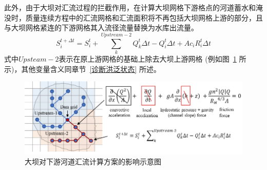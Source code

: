 此外，由于大坝对汇流过程的拦截作用，在计算大坝网格下游格点的河道蓄水和淹没时，质量连续方程中的汇流网格和汇流面积将不再包括大坝网格上游的部分，且与大坝网格紧连的下游网格其入流径流量替换为水库出流量。
\begin{equation}
S_{i}^{t+\Delta t}=S_{i}^{t}+\sum_{k}^{Upstream-2} Q_{k}^{t} \Delta t-Q_{i}^{t} \Delta t+A c_{i} R_{i}^{t} \Delta t
\end{equation}
式中$Upsteam-2$表示在原上游网格的基础上除去大坝上游网格 (例如图~\ref{fig:大坝对下游河道汇流计算方案的影响示意图} 所示)，其他变量含义同章节~\ref{诊断洪泛状态} 所述。

{
\begin{figure}[htbp]
\centering
\includegraphics{Figures/陆地表面的水分循环/大坝对下游河道汇流计算方案的影响示意图.png}
\caption{大坝对下游河道汇流计算方案的影响示意图}
\label{fig:大坝对下游河道汇流计算方案的影响示意图}
\end{figure}
}
